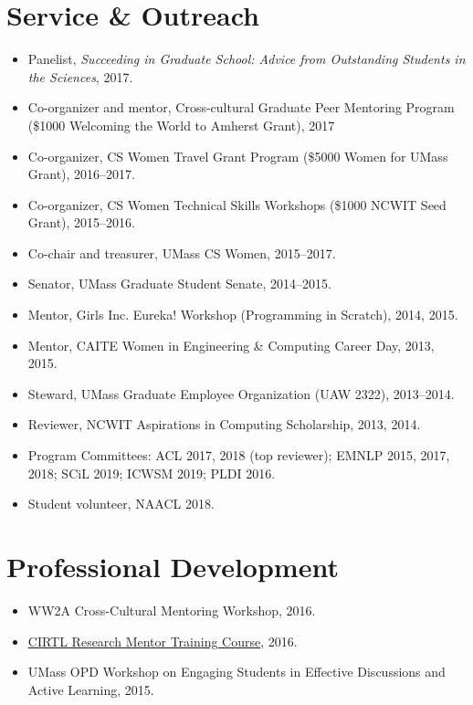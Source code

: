 \documentclass{resume}
\begin{document}
\section{Service \& Outreach}
\begin{itemize}
\item Panelist, \emph{Succeeding in Graduate School: Advice from Outstanding Students in the Sciences}, 2017. 
\item Co-organizer and mentor, Cross-cultural Graduate Peer Mentoring Program (\$1000 Welcoming the World to Amherst Grant), 2017
\item Co-organizer, CS Women Travel Grant Program (\$5000 Women for UMass Grant), 2016--2017.
\item Co-organizer, CS Women Technical Skills Workshops (\$1000 NCWIT Seed Grant), 2015--2016.
\item Co-chair and treasurer, UMass CS Women, 2015--2017.
\item Senator, UMass Graduate Student Senate, 2014--2015.
\item Mentor, Girls Inc. Eureka! Workshop (Programming in Scratch), 2014, 2015.
\item Mentor, CAITE Women in Engineering \& Computing Career Day, 2013, 2015.
\item Steward, UMass Graduate Employee Organization (UAW 2322), 2013--2014.
\item Reviewer, NCWIT Aspirations in Computing Scholarship, 2013, 2014.
\item Program Committees: ACL 2017, 2018 (top reviewer); EMNLP 2015, 2017, 2018; SCiL 2019; ICWSM 2019; PLDI 2016.
\item Student volunteer, NAACL 2018.
\end{itemize}

\section{Professional Development}
\begin{itemize}
\item WW2A Cross-Cultural Mentoring Workshop, 2016.
\item \href{https://www.cirtl.net/courses/261}{CIRTL Research Mentor Training Course}, 2016.
\item UMass OPD Workshop on Engaging Students in Effective Discussions and Active Learning, 2015.
\end{itemize}
\end{document}

